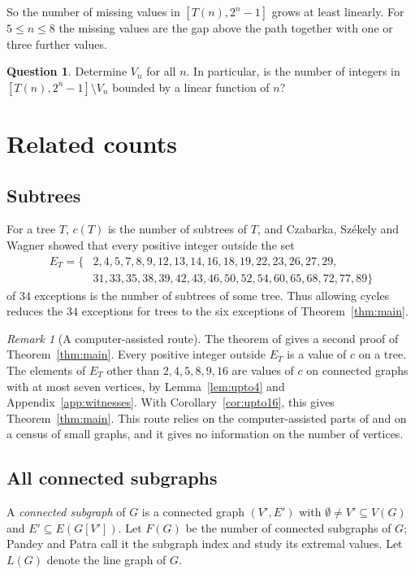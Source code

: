 \documentclass[11pt]{amsart}
\theoremstyle{definition}
\newtheorem{question}[theorem]{Question}
\theoremstyle{remark}
\newtheorem{remark}[theorem]{Remark}
\newcommand{\Tr}[1]{T(#1)}
\begin{document}
So the number of missing values in $[\Tr{n},2^n-1]$ grows at least linearly. For $5\le n\le8$ the missing values are the gap above the path together with one or three further values.

\begin{question}\label{q:Vn}
Determine $V_n$ for all $n$. In particular, is the number of integers in $[\Tr{n},2^n-1]\setminus V_n$ bounded by a linear function of $n$?
\end{question}

\section{Related counts}\label{sec:related}

\subsection{Subtrees}
For a tree $T$, $c(T)$ is the number of subtrees of $T$, and Czabarka, Sz\'ekely and Wagner \cite{CSW} showed that every positive integer outside the set
\begin{align*}
E_T=\{&2,4,5,7,8,9,12,13,14,16,18,19,22,23,26,27,29,\\
&31,33,35,38,39,42,43,46,50,52,54,60,65,68,72,77,89\}
\end{align*}
of $34$ exceptions is the number of subtrees of some tree. Thus allowing cycles reduces the $34$ exceptions for trees to the six exceptions of Theorem~\ref{thm:main}.

\begin{remark}[A computer-assisted route]\label{rem:CSWroute}
The theorem of \cite{CSW} gives a second proof of Theorem~\ref{thm:main}. Every positive integer outside $E_T$ is a value of $c$ on a tree. The elements of $E_T$ other than $2,4,5,8,9,16$ are values of $c$ on connected graphs with at most seven vertices, by Lemma~\ref{lem:upto4} and Appendix~\ref{app:witnesses}. With Corollary~\ref{cor:upto16}, this gives Theorem~\ref{thm:main}. This route relies on the computer-assisted parts of \cite{CSW} and on a census of small graphs, and it gives no information on the number of vertices.
\end{remark}

\subsection{All connected subgraphs}
A \emph{connected subgraph} of $G$ is a connected graph $(V',E')$ with $\emptyset\ne V'\subseteq V(G)$ and $E'\subseteq E(G[V'])$. Let $F(G)$ be the number of connected subgraphs of $G$; Pandey and Patra \cite{PP} call it the subgraph index and study its extremal values. Let $L(G)$ denote the line graph of $G$.
\end{document}
